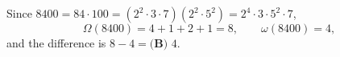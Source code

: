 Since $8400=84\cdot100=\left(2^2\cdot3\cdot7\right)\left(2^2\cdot5^2\right)=2^4\cdot3\cdot5^2\cdot7$,
\[\Omega(8400)=4+1+2+1=8,\qquad\omega(8400)=4,\]
and the difference is $8-4=\boxed{\textbf{(B) }4}$.
